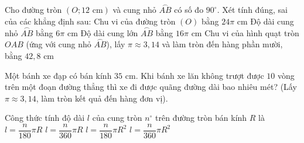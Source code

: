 \begin{ex}%
	Cho đường tròn $(O; 12\text{ cm})$ và cung nhỏ $\overset{\frown}{AB}$ có số đo $90^\circ$. Xét tính đúng, sai của các khẳng định sau:
	\choiceTF
	{\True Chu vi của đường tròn $(O)$ bằng $24\pi\text{ cm}$}
	{\True Độ dài cung nhỏ $\overset{\frown}{AB}$ bằng $6\pi\text{ cm}$}
	{Độ dài cung lớn $\overset{\frown}{AB}$ bằng $16\pi\text{ cm}$}
	{\True Chu vi của hình quạt tròn $OAB$ (ứng với cung nhỏ $\overset{\frown}{AB}$), lấy $\pi \approx 3{,}14$ và làm tròn đến hàng phần mười, bằng $42{,}8\text{ cm}$}
\end{ex}

\begin{bt}%
	Một bánh xe đạp có bán kính $35\text{ cm}$. Khi bánh xe lăn không trượt được $10$ vòng trên một đoạn đường thẳng thì xe đi được quãng đường dài bao nhiêu mét? (Lấy $\pi \approx 3{,}14$, làm tròn kết quả đến hàng đơn vị).
\end{bt}

\begin{ex}%
	Công thức tính độ dài $l$ của cung tròn $n^\circ$ trên đường tròn bán kính $R$ là
	\choice
	{\True $l = \dfrac{n}{180}\pi R$}
	{$l = \dfrac{n}{360}\pi R$}
	{$l = \dfrac{n}{180}\pi R^2$}
	{$l = \dfrac{n}{360}\pi R^2$}
\end{ex}

